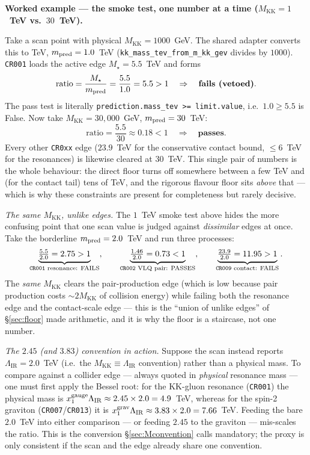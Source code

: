 \documentclass[11pt]{article}
\newenvironment{callout}[1]{%
  \par\medskip\begin{shaded}\noindent\textbf{#1}\par\smallskip}{\end{shaded}\medskip}
\newcommand{\MKK}{M_{\mathrm{KK}}}
\newcommand{\LIR}{\Lambda_{\mathrm{IR}}}
\newcommand{\code}[1]{\texttt{#1}}
\theoremstyle{definition}
\begin{document}
\begin{callout}{Worked example --- the smoke test, one number at a time ($\MKK = 1$~TeV vs.\ $30$~TeV).}
Take a scan point with physical $\MKK = 1000$~GeV. The shared adapter converts
this to TeV, $m_{\rm pred} = 1.0$~TeV (\code{kk\_mass\_tev\_from\_m\_kk\_gev}
divides by $1000$). \code{CR001} loads the active edge $M_\star = 5.5$~TeV and
forms
\[
\text{ratio} = \frac{M_\star}{m_{\rm pred}} = \frac{5.5}{1.0} = 5.5 > 1
\quad\Rightarrow\quad \textbf{fails (vetoed)}.
\]
The pass test is literally \code{prediction.mass\_tev >= limit.value}, i.e.\
$1.0 \ge 5.5$ is False. Now take $\MKK = 30{,}000$~GeV, $m_{\rm pred} = 30$~TeV:
\[
\text{ratio} = \frac{5.5}{30} \approx 0.18 < 1 \quad\Rightarrow\quad \textbf{passes}.
\]
Every other \code{CR0xx} edge ($23.9$~TeV for the conservative contact bound,
$\le 6$~TeV for the resonances) is likewise cleared at $30$~TeV. This single pair of numbers
is the whole behaviour: the direct floor turns off somewhere between a few TeV
and (for the contact tail) tens of TeV, and the rigorous flavour floor sits
\emph{above} that --- which is why these constraints are present for completeness
but rarely decisive.

\medskip
\emph{The same $\MKK$, unlike edges.} The $1$~TeV smoke test above hides the more
confusing point that one scan value is judged against \emph{dissimilar} edges at
once. Take the borderline $m_{\rm pred} = 2.0$~TeV and run three processes:
\[
\underbrace{\tfrac{5.5}{2.0}=2.75>1}_{\text{\code{CR001} resonance: FAILS}},
\qquad
\underbrace{\tfrac{1.46}{2.0}=0.73<1}_{\text{\code{CR002} VLQ pair: PASSES}},
\qquad
\underbrace{\tfrac{23.9}{2.0}=11.95>1}_{\text{\code{CR009} contact: FAILS}}.
\]
The \emph{same} $\MKK$ clears the pair-production edge (which is low because pair
production costs $\sim 2\MKK$ of collision energy) while failing both the
resonance edge and the contact-scale edge --- this is the ``union of unlike
edges'' of \S\ref{sec:floor} made arithmetic, and it is why the floor is a
staircase, not one number.

\medskip
\emph{The $2.45$ (and $3.83$) convention in action.} Suppose the scan instead
reports $\LIR = 2.0$~TeV (i.e.\ the $\MKK\equiv\LIR$ convention) rather than a
physical mass. To compare against a collider edge --- always quoted in
\emph{physical} resonance mass --- one must first apply the Bessel root: for the
KK-gluon resonance (\code{CR001}) the physical mass is
$x_1^{\rm gauge}\LIR \approx 2.45\times 2.0 = 4.9$~TeV, whereas for the spin-2
graviton (\code{CR007}/\code{CR013}) it is $x_1^{\rm grav}\LIR \approx 3.83\times
2.0 = 7.66$~TeV. Feeding the bare $2.0$~TeV into either comparison --- or feeding
$2.45$ to the graviton --- mis-scales the ratio. This is the conversion
\S\ref{sec:Mconvention} calls mandatory; the proxy is only consistent if the
scan and the edge already share one convention.
\end{callout}
\end{document}
